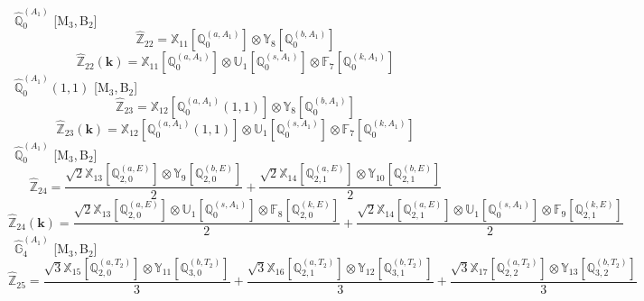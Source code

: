 \documentclass[fleqn,10pt,landscape]{article}
\begin{document}
\begin{itemize}
\begin{dmath*}
\end{dmath*}
\vspace{4mm}
\noindent {} $\,\,\,\hat{\mathbb{Q}}_{0}^{(A_{1})}$ [M$_{3}$,\,B$_{2}$]
\begin{dmath*}
\hat{\mathbb{Z}}_{22}=\mathbb{X}_{11}[\mathbb{Q}_{0}^{(a,A_{1})}] \otimes\mathbb{Y}_{8}[\mathbb{Q}_{0}^{(b,A_{1})}]
\end{dmath*}
\begin{dmath*}
\hat{\mathbb{Z}}_{22}(\bm{k})=\mathbb{X}_{11}[\mathbb{Q}_{0}^{(a,A_{1})}] \otimes\mathbb{U}_{1}[\mathbb{Q}_{0}^{(s,A_{1})}] \otimes\mathbb{F}_{7}[\mathbb{Q}_{0}^{(k,A_{1})}]
\end{dmath*}
\vspace{4mm}
\noindent {} $\,\,\,\hat{\mathbb{Q}}_{0}^{(A_{1})}(1,1)$ [M$_{3}$,\,B$_{2}$]
\begin{dmath*}
\hat{\mathbb{Z}}_{23}=\mathbb{X}_{12}[\mathbb{Q}_{0}^{(a,A_{1})}(1,1)] \otimes\mathbb{Y}_{8}[\mathbb{Q}_{0}^{(b,A_{1})}]
\end{dmath*}
\begin{dmath*}
\hat{\mathbb{Z}}_{23}(\bm{k})=\mathbb{X}_{12}[\mathbb{Q}_{0}^{(a,A_{1})}(1,1)] \otimes\mathbb{U}_{1}[\mathbb{Q}_{0}^{(s,A_{1})}] \otimes\mathbb{F}_{7}[\mathbb{Q}_{0}^{(k,A_{1})}]
\end{dmath*}
\vspace{4mm}
\noindent {} $\,\,\,\hat{\mathbb{Q}}_{0}^{(A_{1})}$ [M$_{3}$,\,B$_{2}$]
\begin{dmath*}
\hat{\mathbb{Z}}_{24}=\frac{\sqrt{2} \mathbb{X}_{13}[\mathbb{Q}_{2,0}^{(a,E)}] \otimes\mathbb{Y}_{9}[\mathbb{Q}_{2,0}^{(b,E)}]}{2} + \frac{\sqrt{2} \mathbb{X}_{14}[\mathbb{Q}_{2,1}^{(a,E)}] \otimes\mathbb{Y}_{10}[\mathbb{Q}_{2,1}^{(b,E)}]}{2}
\end{dmath*}
\begin{dmath*}
\hat{\mathbb{Z}}_{24}(\bm{k})=\frac{\sqrt{2} \mathbb{X}_{13}[\mathbb{Q}_{2,0}^{(a,E)}] \otimes\mathbb{U}_{1}[\mathbb{Q}_{0}^{(s,A_{1})}] \otimes\mathbb{F}_{8}[\mathbb{Q}_{2,0}^{(k,E)}]}{2} + \frac{\sqrt{2} \mathbb{X}_{14}[\mathbb{Q}_{2,1}^{(a,E)}] \otimes\mathbb{U}_{1}[\mathbb{Q}_{0}^{(s,A_{1})}] \otimes\mathbb{F}_{9}[\mathbb{Q}_{2,1}^{(k,E)}]}{2}
\end{dmath*}
\vspace{4mm}
\noindent {} $\,\,\,\hat{\mathbb{G}}_{4}^{(A_{1})}$ [M$_{3}$,\,B$_{2}$]
\begin{dmath*}
\hat{\mathbb{Z}}_{25}=\frac{\sqrt{3} \mathbb{X}_{15}[\mathbb{Q}_{2,0}^{(a,T_{2})}] \otimes\mathbb{Y}_{11}[\mathbb{Q}_{3,0}^{(b,T_{2})}]}{3} + \frac{\sqrt{3} \mathbb{X}_{16}[\mathbb{Q}_{2,1}^{(a,T_{2})}] \otimes\mathbb{Y}_{12}[\mathbb{Q}_{3,1}^{(b,T_{2})}]}{3} + \frac{\sqrt{3} \mathbb{X}_{17}[\mathbb{Q}_{2,2}^{(a,T_{2})}] \otimes\mathbb{Y}_{13}[\mathbb{Q}_{3,2}^{(b,T_{2})}]}{3}

\end{dmath*}
\end{itemize}
\end{document}
